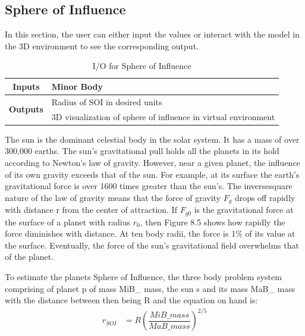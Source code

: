 \subsection{Sphere of Influence}
In this section, the user can either input the values or interact with the model in the 3D environment to see the corresponding output.
\begin{table}[H]
\centering
\begin{tabular}{@{}rl@{}}
\toprule
\multicolumn{1}{c}{\textbf{Inputs}} & Minor Body                     \\ \midrule
\multirow{2}{*}{\textbf{Outputs}}   & Radius of SOI in desired units \\ \cmidrule(l){2-2} 
                           & 3D visualization of sphere of influence in virtual environment                         \\ \bottomrule
\end{tabular}
\caption{I/O for Sphere of Influence}
\label{soi}
\end{table}
The sun is the dominant celestial body in the solar system. It has a mass of over 300,000 earths. The sun’s gravitational pull holds all the planets in its hold according to Newton’s law of gravity. However, near a given planet, the influence of its own gravity exceeds that of the sun. For example, at its surface the earth’s gravitational force is over 1600 times greater than the sun’s. The inversesquare nature of the law of gravity means that the force of gravity $F_g$ drops off rapidly with distance r from the center of attraction. If $F_{g0}$ is the gravitational force at the surface of a planet with radius $r_0$, then Figure 8.5 shows how rapidly the force diminishes with distance. At ten body radii, the force is 1$\%$ of its value at the surface. Eventually, the force of the sun’s gravitational field overwhelms that of the planet.

To estimate the planets Sphere of Influence, the three body problem system comprising of planet p of mass MiB\_ mass, the sun s and its mass MaB\_ mass with the distance between then being R and the equation on hand is:
\begin{align*}
r_{SOI}&=R\left(\dfrac{MiB\_ mass}{MaB\_ mass}\right)^{2/5}
\end{align*}

